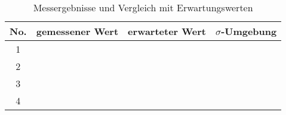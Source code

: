\begin{table}[H]
  \centering
  \caption{Messergebnisse und Vergleich mit Erwartungswerten}

  \begin{tabular}{|c|c|c|c|}
    No. & gemessener Wert & erwarteter Wert & $\sigma$-Umgebung \\
    \hline
    1 & & &  \\
    2 & & &  \\
    3 & & &  \\
    4 & & &  \\
  \end{tabular}
\end{table}
